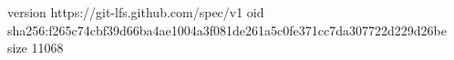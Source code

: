 version https://git-lfs.github.com/spec/v1
oid sha256:f265c74cbf39d66ba4ae1004a3f081de261a5c0fe371cc7da307722d229d26be
size 11068
